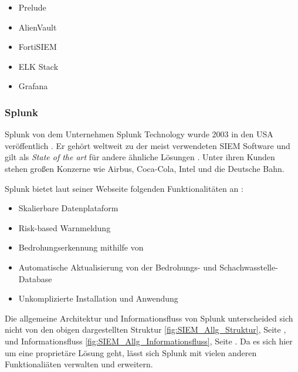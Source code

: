 \begin{itemize}[noitemsep]
   \item Prelude %
   \item AlienVault  %
   \item FortiSIEM %
   \item ELK Stack %
   \item Grafana %
\end{itemize}


\newpage
\subsubsection{Splunk}
Splunk von dem Unternehmen Splunk Technology wurde 2003 in den USA veröffentlich \citep{Splunk_splunk}. Er gehört weltweit zu der meist verwendeten \gls{SIEM} Software und gilt als \textit{State of the art} für andere ähnliche Lösungen \citep{Kazarov_Splunk}. Unter ihren Kunden stehen großen Konzerne wie Airbus, Coca-Cola, Intel und die Deutsche Bahn.

Splunk bietet laut seiner Webseite folgenden Funktionalitäten an \citep{Splunk_SPE}:

\begin{itemize}[noitemsep]
   \item Skalierbare Datenplataform
   \item Risk-based Warnmeldung 
   \item Bedrohungserkennung mithilfe von 
   \item Automatische Aktualisierung von der Bedrohungs- und Schachwasstelle-Database  
   \item Unkomplizierte Installation und Anwendung
\end{itemize}

Die allgemeine Architektur und Informationsfluss von Splunk unterscheided sich nicht von den obigen dargestellten Struktur \ref{fig:SIEM_Allg_Struktur}, Seite \pageref{fig:SIEM_Allg_Struktur}, und Informationsfluss \ref{fig:SIEM_Allg_Informationsfluss}, Seite \pageref{fig:SIEM_Allg_Informationsfluss}. Da es sich hier um eine proprietäre Lösung geht, lässt sich Splunk mit vielen anderen Funktionaliäten verwalten und erweitern. 

